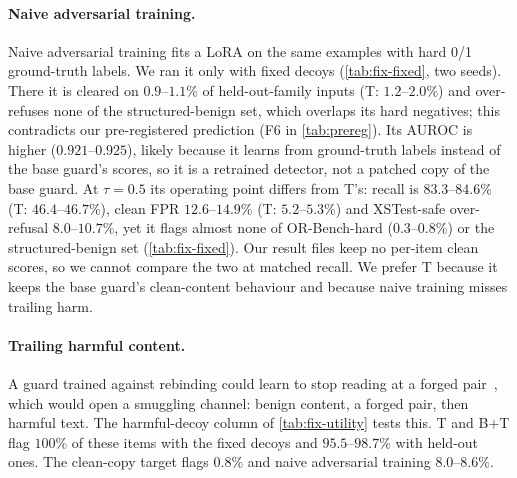\paragraph{Naive adversarial training.}
Naive adversarial training fits a LoRA on the same examples with hard 0/1 ground-truth labels. We ran it only with fixed decoys (\cref{tab:fix-fixed}, two seeds). There it is cleared on $0.9$--$1.1\%$ of held-out-family inputs (T: $1.2$--$2.0\%$) and over-refuses none of the structured-benign set, which overlaps its hard negatives; this contradicts our pre-registered prediction (F6 in \cref{tab:prereg}). %
Its AUROC is higher ($0.921$--$0.925$), likely because it learns from ground-truth labels instead of the base guard's scores, so it is a retrained detector, not a patched copy of the base guard. At $\tau=0.5$ its operating point differs from T's: recall is $83.3$--$84.6\%$ (T: $46.4$--$46.7\%$), clean FPR $12.6$--$14.9\%$ (T: $5.2$--$5.3\%$) and XSTest-safe over-refusal $8.0$--$10.7\%$, yet it flags almost none of OR-Bench-hard ($0.3$--$0.8\%$) or the structured-benign set (\cref{tab:fix-fixed}). %
Our result files keep no per-item clean scores, so we cannot compare the two at matched recall. %
We prefer T because it keeps the base guard's clean-content behaviour and because naive training misses trailing harm.

\paragraph{Trailing harmful content.}
\label{sec:shortcut}
A guard trained against rebinding could learn to stop reading at a forged pair~\citep{wang2025illusion}, which would open a smuggling channel: benign content, a forged pair, then harmful text. The harmful-decoy column of \cref{tab:fix-utility} tests this.
T and B$+$T flag $100\%$ of these items with the fixed decoys and $95.5$--$98.7\%$ with held-out ones. The clean-copy target flags $0.8\%$ and naive adversarial training $8.0$--$8.6\%$. %

